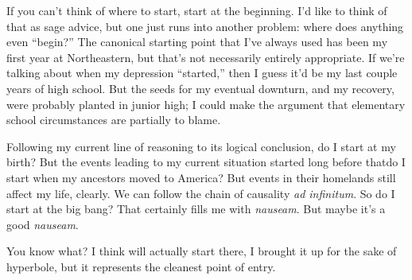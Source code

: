 \documentclass[./butidigress.tex]{subfiles}
\begin{document}
If you can't think of where to start, start at the beginning.
I'd like to think of that as sage advice, but one just runs into another problem: where does anything even \enquote{begin?}
The canonical starting point that I've always used has been my first year at Northeastern, but that's not necessarily entirely appropriate.
If we're talking about when my depression \enquote{started,} then I guess it'd be my last couple years of high school.
But the seeds for my eventual downturn, and my recovery, were probably planted in junior high; I could make the argument that elementary school circumstances are partially to blame.

Following my current line of reasoning to its logical conclusion, do I start at my birth?
But the events leading to my current situation started long before that\lips do I start when my ancestors moved to America?
But events in their homelands still affect my life, clearly.
We can follow the chain of causality \textit{ad infinitum}.
So do I start at the big bang?
That certainly fills me with \textit{nauseam}.
But maybe it's a good \textit{nauseam}.

You know what?
I think will actually start there, I brought it up for the sake of hyperbole, but it represents the cleanest point of entry.


\end{document}
